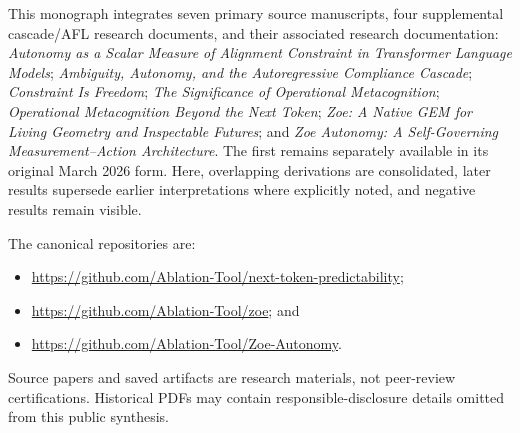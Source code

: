 \documentclass[11pt,letterpaper]{article}
\theoremstyle{definition}
\theoremstyle{plain}
\theoremstyle{remark}
\begin{document}
This monograph integrates seven primary source manuscripts, four supplemental cascade/AFL research documents, and their associated research documentation: \emph{Autonomy as a Scalar Measure of Alignment Constraint in Transformer Language Models}; \emph{Ambiguity, Autonomy, and the Autoregressive Compliance Cascade}; \emph{Constraint Is Freedom}; \emph{The Significance of Operational Metacognition}; \emph{Operational Metacognition Beyond the Next Token}; \emph{Zoe: A Native GEM for Living Geometry and Inspectable Futures}; and \emph{Zoe Autonomy: A Self-Governing Measurement--Action Architecture}. The first remains separately available in its original March 2026 form. Here, overlapping derivations are consolidated, later results supersede earlier interpretations where explicitly noted, and negative results remain visible.

The canonical repositories are:
\begin{itemize}
  \item \url{https://github.com/Ablation-Tool/next-token-predictability};
  \item \url{https://github.com/Ablation-Tool/zoe}; and
  \item \url{https://github.com/Ablation-Tool/Zoe-Autonomy}.
\end{itemize}
Source papers and saved artifacts are research materials, not peer-review certifications. Historical PDFs may contain responsible-disclosure details omitted from this public synthesis.

\tableofcontents
\clearpage









\appendix


\end{document}
